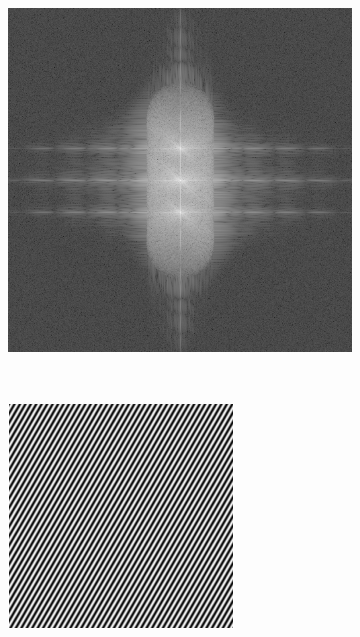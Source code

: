 \begin{figure}[ht!]
\begin{subfigure}[t]{0.23\textwidth}
      \caption{}
  \end{subfigure}\hfill
  \begin{subfigure}[t]{0.23\textwidth}
      \centering
      \includegraphics[width=\textwidth]{sim_slit/1/fft}
      \caption{}
  \end{subfigure}\\\vspace{\abovecaptionskip}
  \begin{subfigure}[t]{0.23\textwidth}
      \centering
      \includegraphics[width=\textwidth]{sim_slit/2/angle_pattern}

\end{subfigure}
\end{figure}
